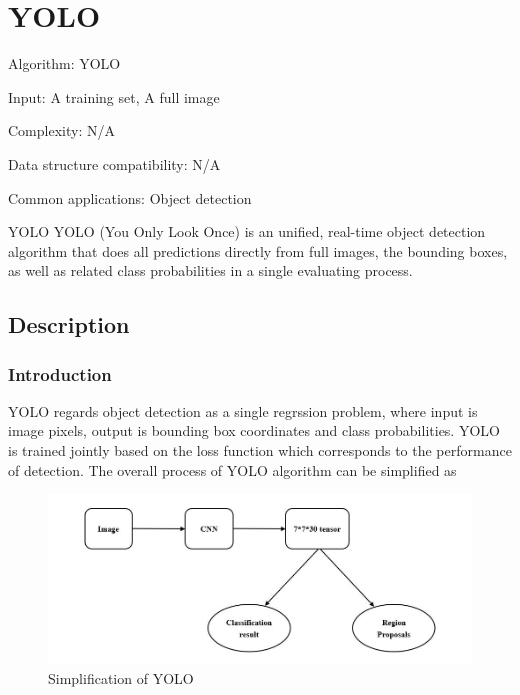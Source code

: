 \documentclass[catalog.tex]{subfiles}
\begin{document}
\def\pbname{YOLO} %

\section{\pbname} 

\begin{overview}
\item [Algorithm:] YOLO
\item [Input:] A training set, A full image
\item [Complexity:] N/A
\item [Data structure compatibility:] N/A
\item [Common applications:] Object detection
\end{overview}


\begin{problem}{\pbname}
	YOLO (You Only Look Once) is an unified, real-time object detection algorithm that does all predictions directly from full images, the bounding boxes, as well as related class probabilities in a single evaluating process. 
\end{problem}
\subsection*{Description}
\subsubsection*{Introduction}
\par YOLO regards object detection as a single regrssion problem, where input is image pixels, output is bounding box coordinates and class probabilities. YOLO is trained jointly based on the loss function which corresponds to the performance of detection. The overall process of YOLO algorithm can be simplified as
\begin{figure}[h]
	\includegraphics[width=\textwidth]{problem-117_a.jpg}
	\caption{Simplification of YOLO}
\end{figure} 
\newpage
\end{document}
